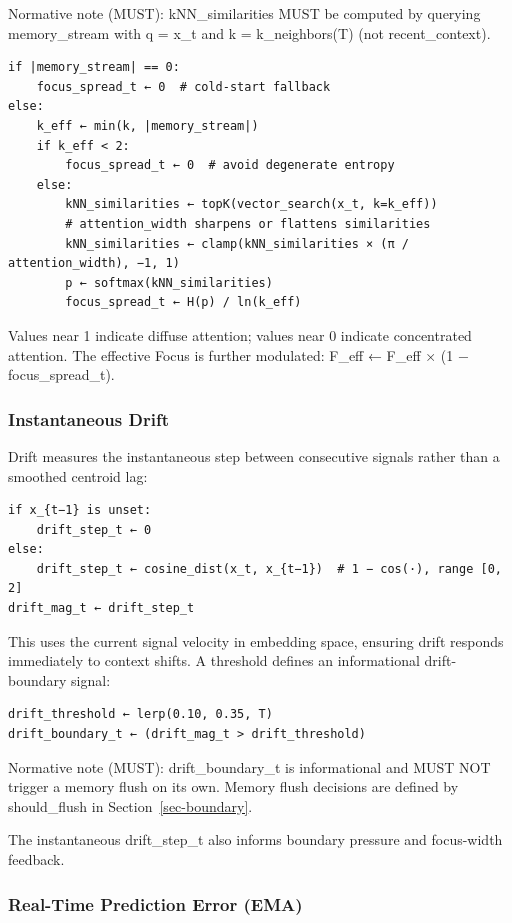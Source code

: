\documentclass[
  letterpaper,
  DIV=11,
  numbers=noendperiod]{scrartcl}
\begin{document}
Normative note (MUST): kNN\_similarities MUST be computed by querying
memory\_stream with q = x\_t and k = k\_neighbors(T) (not
recent\_context).

\begin{verbatim}
if |memory_stream| == 0:
    focus_spread_t ← 0  # cold-start fallback
else:
    k_eff ← min(k, |memory_stream|)
    if k_eff < 2:
        focus_spread_t ← 0  # avoid degenerate entropy
    else:
        kNN_similarities ← topK(vector_search(x_t, k=k_eff))
        # attention_width sharpens or flattens similarities
        kNN_similarities ← clamp(kNN_similarities × (π / attention_width), −1, 1)
        p ← softmax(kNN_similarities)
        focus_spread_t ← H(p) / ln(k_eff)
\end{verbatim}

Values near 1 indicate diffuse attention; values near 0 indicate
concentrated attention. The effective Focus is further modulated: F\_eff
← F\_eff × (1 − focus\_spread\_t).

\subsubsection{Instantaneous Drift}\label{instantaneous-drift}

Drift measures the instantaneous step between consecutive signals rather
than a smoothed centroid lag:

\begin{verbatim}
if x_{t−1} is unset:
    drift_step_t ← 0
else:
    drift_step_t ← cosine_dist(x_t, x_{t−1})  # 1 − cos(·), range [0, 2]
drift_mag_t ← drift_step_t
\end{verbatim}

This uses the current signal velocity in embedding space, ensuring drift
responds immediately to context shifts. A threshold defines an
informational drift-boundary signal:

\begin{verbatim}
drift_threshold ← lerp(0.10, 0.35, T)
drift_boundary_t ← (drift_mag_t > drift_threshold)
\end{verbatim}

Normative note (MUST): drift\_boundary\_t is informational and MUST NOT
trigger a memory flush on its own. Memory flush decisions are defined by
should\_flush in Section~\ref{sec-boundary}.

The instantaneous drift\_step\_t also informs boundary pressure and
focus-width feedback.

\subsubsection{Real-Time Prediction Error
(EMA)}\label{real-time-prediction-error-ema}
\end{document}
